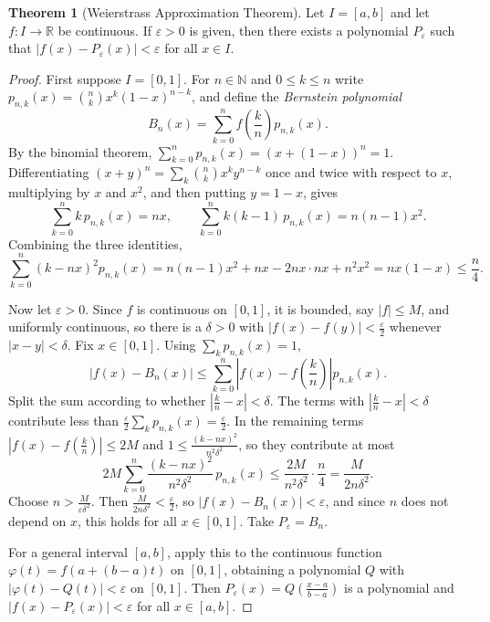 \documentclass[11pt,a4paper]{article}
\numberwithin{equation}{section}
\theoremstyle{definition}
\newtheorem{thm}{Theorem}[subsection]
\begin{document}
\begin{thm}[Weierstrass Approximation Theorem]
Let $I = [a,b]$ and let $f: I\longrightarrow \mathbb{R}$ be continuous. If $\varepsilon > 0$ is given, then there exists a polynomial $P_{\varepsilon}$ such that $|f(x) - P_{\varepsilon}(x)| < \varepsilon$ for all $x\in I$.
\end{thm}

\begin{proof}
First suppose $I = [0,1]$. For $n\in\mathbb{N}$ and $0\leq k\leq n$ write $p_{n,k}(x) = \binom{n}{k}x^k(1-x)^{n-k}$, and define the \emph{Bernstein polynomial}
$$B_n(x) = \sum_{k=0}^n f\!\left(\frac{k}{n}\right) p_{n,k}(x).$$
By the binomial theorem, $\sum_{k=0}^n p_{n,k}(x) = (x + (1-x))^n = 1$. Differentiating $(x+y)^n = \sum_k\binom{n}{k}x^ky^{n-k}$ once and twice with respect to $x$, multiplying by $x$ and $x^2$, and then putting $y = 1-x$, gives
$$\sum_{k=0}^n k\,p_{n,k}(x) = nx, \qquad \sum_{k=0}^n k(k-1)\,p_{n,k}(x) = n(n-1)x^2 .$$
Combining the three identities,
$$\sum_{k=0}^n (k - nx)^2 p_{n,k}(x) = n(n-1)x^2 + nx - 2nx\cdot nx + n^2x^2 = nx(1-x) \leq \frac{n}{4}.$$

Now let $\varepsilon>0$. Since $f$ is continuous on $[0,1]$, it is bounded, say $|f|\leq M$, and uniformly continuous, so there is a $\delta>0$ with $|f(x) - f(y)|<\frac{\varepsilon}{2}$ whenever $|x - y|<\delta$. Fix $x\in[0,1]$. Using $\sum_k p_{n,k}(x) = 1$,
$$|f(x) - B_n(x)| \leq \sum_{k=0}^n \left|f(x) - f\!\left(\frac{k}{n}\right)\right| p_{n,k}(x).$$
Split the sum according to whether $\left|\frac{k}{n} - x\right| < \delta$. The terms with $\left|\frac{k}{n} - x\right| < \delta$ contribute less than $\frac{\varepsilon}{2}\sum_k p_{n,k}(x) = \frac{\varepsilon}{2}$. In the remaining terms $|f(x) - f(\frac{k}{n})|\leq 2M$ and $1\leq \frac{(k-nx)^2}{n^2\delta^2}$, so they contribute at most
$$2M\sum_{k=0}^n \frac{(k-nx)^2}{n^2\delta^2}\,p_{n,k}(x) \leq \frac{2M}{n^2\delta^2}\cdot\frac{n}{4} = \frac{M}{2n\delta^2}.$$
Choose $n > \frac{M}{\varepsilon\delta^2}$. Then $\frac{M}{2n\delta^2}<\frac{\varepsilon}{2}$, so $|f(x) - B_n(x)|<\varepsilon$, and since $n$ does not depend on $x$, this holds for all $x\in[0,1]$. Take $P_\varepsilon = B_n$.

For a general interval $[a,b]$, apply this to the continuous function $\varphi(t) = f(a + (b-a)t)$ on $[0,1]$, obtaining a polynomial $Q$ with $|\varphi(t) - Q(t)|<\varepsilon$ on $[0,1]$. Then $P_\varepsilon(x) = Q\!\left(\frac{x-a}{b-a}\right)$ is a polynomial and $|f(x) - P_\varepsilon(x)|<\varepsilon$ for all $x\in[a,b]$.
\end{proof}
\end{document}
